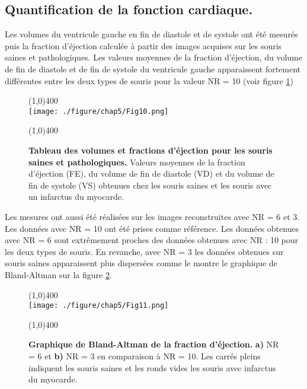 \subsection{Quantification de la fonction cardiaque.}

Les volumes du ventricule gauche en fin de diastole et de systole ont été mesurés puis la fraction d'éjection calculée à partir des images acquises sur les souris saines et pathologiques. Les valeurs moyennes de la fraction d'éjection, du volume de fin de diastole et de fin de systole du ventricule gauche apparaissent fortement différentes entre les deux types de souris pour la valeur NR = 10 (voir figure \ref{fig:TabFractionEjection})

\begin{figure}[H]
\centering
\line(1,0){400} \\
\texttt{[image: ./figure/chap5/Fig10.png]}
\caption[Tableau des volumes et fractions d'éjection pour les souris saines et pathologiques.]{\label{fig:TabFractionEjection} \textbf{Tableau des volumes et fractions d'éjection pour les souris saines et pathologiques.} Valeurs moyennes de la fraction d’éjection (FE), du volume de fin de diastole (VD) et du volume de fin de systole (VS) obtenues chez les souris saines et les souris avec un infarctus du myocarde.}
\line(1,0){400} \\ 
\end{figure}

Les mesures ont aussi été réalisées sur les images reconstruites avec NR = 6 et 3. Les données avec NR = 10 ont été prises comme référence. Les données obtenues avec NR = 6 sont extrêmement proches des données obtenues avec NR : 10 pour les deux types de souris. En revanche, avec NR = 3 les données obtenues sur souris saines apparaissent plus dispersées comme le montre le graphique de Bland-Altman sur la figure \ref{fig:BlandAltmanFractionEjection}.

\begin{figure}[H]
\centering
\line(1,0){400} \\
\texttt{[image: ./figure/chap5/Fig11.png]}
\caption[Graphique de Bland-Altman de la fraction d’éjection.]{\label{fig:BlandAltmanFractionEjection} \textbf{Graphique de Bland-Altman de la fraction d’éjection.} \textbf{a)} NR = 6 et \textbf{b)} NR = 3 en comparaison à NR = 10. Les carrés pleins indiquent les souris saines et les ronds vides les souris avec infarctus du myocarde.}
\line(1,0){400} \\ 
\end{figure}


